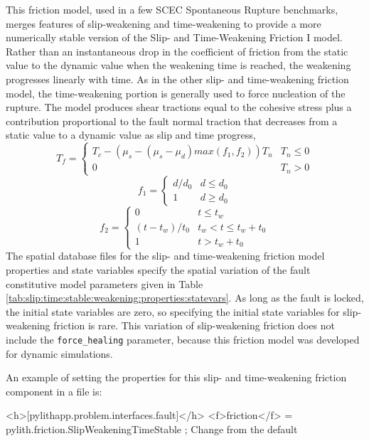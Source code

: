 This friction model, used in a few SCEC Spontaneous Rupture benchmarks,
merges features of slip-weakening and time-weakening to provide a
more numerically stable version of the Slip- and Time-Weakening Friction
I model. Rather than an instantaneous drop in the coefficient of friction
from the static value to the dynamic value when the weakening time
is reached, the weakening progresses linearly with time. As in the
other slip- and time-weakening friction model, the time-weakening
portion is generally used to force nucleation of the rupture. The
model produces shear tractions equal to the cohesive stress plus a
contribution proportional to the fault normal traction that decreases
from a static value to a dynamic value as slip and time progress,
\begin{equation}
T_{f}=\begin{cases}
T_{c}-(\mu_{s}-(\mu_{s}-\mu_{d})max(f_{1},f_{2}))T_{n} & T_{n}\leq0\\
0 & T_{n}>0
\end{cases}
\end{equation}
\begin{equation}
f_{1}=\begin{cases}
d/d_{0} & d\leq d_{0}\\
1 & d\ge d_{0}
\end{cases}
\end{equation}
\begin{equation}
f_{2}=\begin{cases}
0 & t\leq t_{w}\\
(t-t_{w})/t_{0} & t_{w}<t\le t_{w}+t_{0}\\
1 & t>t_{w}+t_{0}
\end{cases}
\end{equation}
The spatial database files for the slip- and time-weakening friction
model properties and state variables specify the spatial variation
of the fault constitutive model parameters given in Table \vref{tab:slip:time:stable:weakening:properties:statevars}.
As long as the fault is locked, the initial state variables are zero,
so specifying the initial state variables for slip-weakening friction
is rare. This variation of slip-weakening friction does not include
the \texttt{force\_healing} parameter, because this friction model
was developed for dynamic simulations.

An example of setting the properties for this slip- and time-weakening friction
component in a  file is:
\begin{cfg}
<h>[pylithapp.problem.interfaces.fault]</h>
<f>friction</f> = pylith.friction.SlipWeakeningTimeStable ; Change from the default
\end{cfg}

